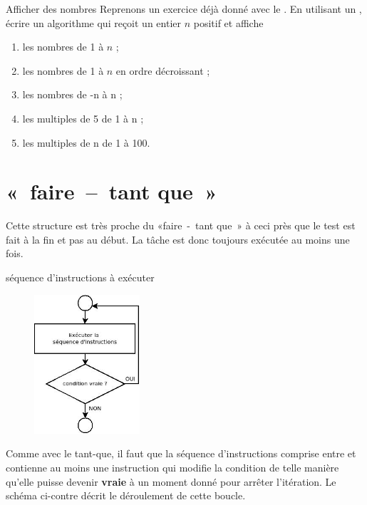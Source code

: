 		\begin{Exercice}{Afficher des nombres}
			Reprenons un exercice déjà donné avec le \lda{\algorithmicwhile}.
			En utilisant un \lda{\algorithmicfor},
			écrire un algorithme qui reçoit un entier $n$ positif et affiche
			\begin{enumerate}[label=\alph*)]
			\item les nombres de 1 à $n$ ;
			\item les nombres de 1 à $n$ en ordre décroissant ;
			\item les nombres de -n à n ;
			\item les multiples de 5 de 1 à n ;
			\item les multiples de n de 1 à 100.
			\end{enumerate}
		\end{Exercice}

\section{«~faire~–~tant que~»}

	Cette structure est très proche du «faire~-~tant que~» 
	à ceci près que le test est fait à la fin et pas au début. 
	La tâche est donc toujours exécutée au moins une fois.

	\begin{LDA}
	\Repeat
		\Stmt séquence d’instructions à exécuter
	\end{LDA}

		\begin{figure}
		\vskip-4mm
		\includegraphics[width=0.35\textwidth]{image/boucle-faire}
				\label{fig:boucle-faire}
		\vskip-10mm
		\end{figure}

	Comme avec le tant-que, 
	il faut que la séquence d’instructions comprise entre
	 et  
	contienne au moins une instruction qui modifie la condition de
	telle manière qu’elle puisse devenir \textbf{vraie} à un moment donné
	pour arrêter l’itération. 
	Le schéma ci-contre décrit le déroulement de cette boucle. 
	
